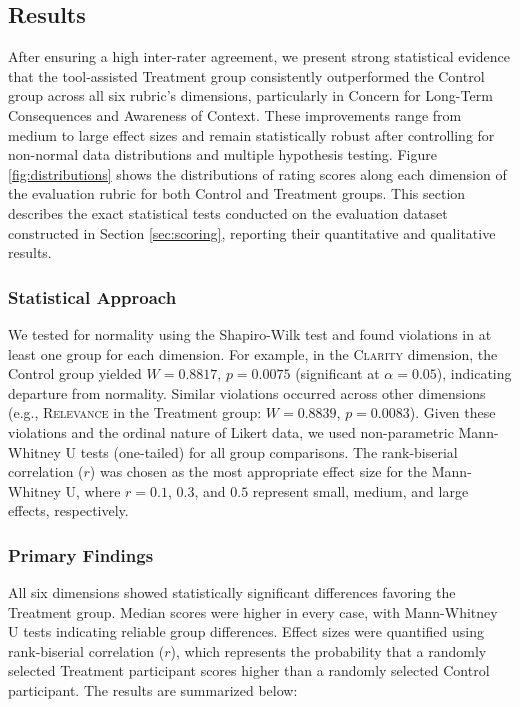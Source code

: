
\subsection{Results}

After ensuring a high inter-rater agreement, we present strong statistical evidence that
the tool-assisted Treatment group consistently outperformed the Control group across all six rubric's dimensions, particularly in Concern for Long-Term Consequences and Awareness of Context. These improvements range from medium to large effect sizes and remain statistically robust after controlling for non-normal data distributions and multiple hypothesis testing. Figure \ref{fig:distributions} shows the distributions of rating scores along each dimension of the evaluation rubric for both Control and Treatment groups. This section describes the exact statistical tests conducted on the evaluation dataset constructed in Section \ref{sec:scoring}, reporting their quantitative and qualitative results.

\subsubsection*{Statistical Approach}

We tested for normality using the Shapiro-Wilk test and found violations in at least one group for each dimension. For example, in the \textsc{Clarity} dimension, the Control group yielded $W = 0.8817$, $p = 0.0075$ (significant at $\alpha = 0.05$), indicating departure from normality. Similar violations occurred across other dimensions (e.g., \textsc{Relevance} in the Treatment group: $W = 0.8839$, $p = 0.0083$). Given these violations and the ordinal nature of Likert data, we used non-parametric Mann-Whitney U tests (one-tailed) for all group comparisons.
The rank-biserial correlation ($r$) was chosen as the most appropriate effect size for the Mann-Whitney U, where $r = 0.1$, $0.3$, and $0.5$ represent small, medium, and large effects, respectively.

\subsubsection*{Primary Findings}

All six dimensions showed statistically significant differences favoring the Treatment group. Median scores were higher in every case, with Mann-Whitney U tests indicating reliable group differences. Effect sizes were quantified using rank-biserial correlation ($r$), which represents the probability that a randomly selected Treatment participant scores higher than a randomly selected Control participant.
The results are summarized below:

